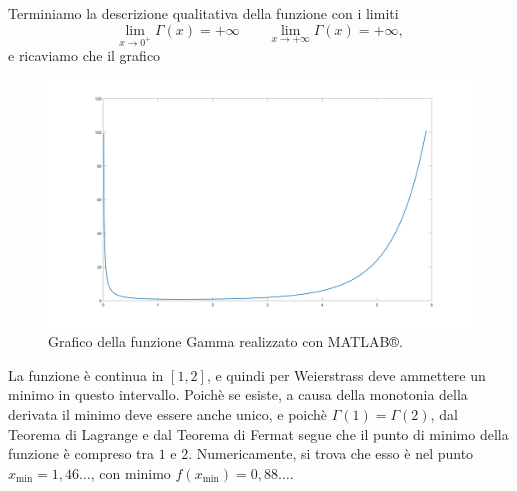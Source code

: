 Terminiamo la descrizione qualitativa della funzione con i limiti
\begin{equation*}
	\lim \limits_{x \to0^+} \Gamma(x) =
	+ \infty \qquad \lim \limits_{x \to+ \infty} \Gamma(x) =
	+ \infty,
\end{equation*}
e ricaviamo che il grafico
\begin{figure}
	\centering
	\includegraphics[width=.9\textwidth]{assets/gamma_graph.jpg}
	\caption{Grafico della funzione Gamma realizzato con MATLAB®.}
\end{figure}

La funzione è continua in $[1,2]$, e quindi per Weierstrass deve ammettere un minimo in questo intervallo. 
Poichè se esiste, a causa della monotonia della derivata il minimo deve essere anche unico, e poichè $ \Gamma(1)= \Gamma(2)$, dal Teorema di Lagrange e dal Teorema di Fermat segue che il punto di minimo della funzione è compreso tra $1$ e $2$. 
Numericamente, si trova che esso è nel punto $x_{ \min}=1,46 \dots$, con minimo $f(x_{ \min})=0,88 \dots$.

